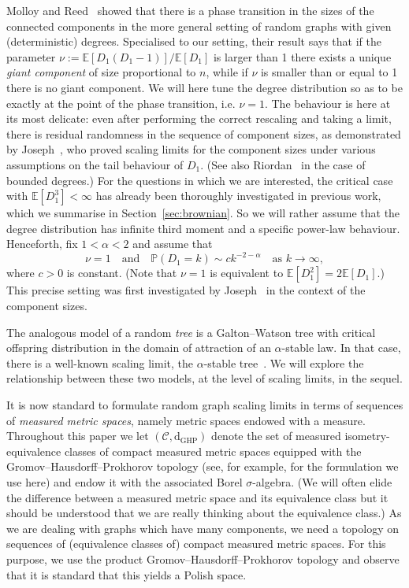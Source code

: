 \documentclass[10pt]{amsart}
\theoremstyle{definition}\newtheorem{defi}[theo]{Definition}\newtheorem{rema}[theo]{Remark}\newtheorem{exam}[theo]{Example}\newtheorem{exem}[theo]{Example}\newtheorem{nota}[theo]{Notation}
\newcommand{\E}[1]{\ensuremath{\mathbb{E} \left[#1 \right]}}
\newcommand{\Prob}[1]{\ensuremath{\mathbb{P} \left(#1 \right)}}
\newcommand{\GHP}{\mathrm{GHP}}
\newcommand{\rmd}{\mathrm{d}}
\newcommand{\scrC}{\mathscr{C}}
\newcommand{\bbE}{\mathbb{E}}
\begin{document}
Molloy and Reed~\cite{MolloyReed} showed that there is a phase transition in the sizes of the connected components in the more general setting of random graphs with given (deterministic) degrees. Specialised to our setting, their result says that if the parameter $\nu:=\bbE[D_1(D_1-1)]/\bbE[D_1]$ is larger than 1 there exists a unique \emph{giant component} of size proportional to $n$, while if $\nu$ is smaller than or equal to 1 there is no giant component. We will here tune the degree distribution so as to be exactly at the point of the phase transition, i.e. $\nu = 1$. The behaviour is here at its most delicate: even after performing the correct rescaling and taking a limit, there is residual randomness in the sequence of component sizes, as demonstrated by Joseph~\cite{Joseph14}, who proved scaling limits for the component sizes under various assumptions on the tail behaviour of $D_1$. (See also Riordan~\cite{Riordan12} in the case of bounded degrees.) For the questions in which we are interested, the critical case with $\E{D_1^3} < \infty$ has already been thoroughly investigated in previous work, which we summarise in Section~\ref{sec:brownian}. So we will rather assume that the degree distribution has infinite third moment and a specific power-law behaviour. Henceforth, fix $1 <\alpha <2$ and assume that
\begin{equation}\label{hyp:stable}
\nu = 1 \quad \text{and} \quad \Prob{D_1 = k} \sim c k^{-2-\alpha} \quad \text{as } k \to \infty,
\end{equation}
where $c > 0$ is constant. (Note that $\nu = 1$ is equivalent to $\E{D_1^2} = 2 \E{D_1}$.) This precise setting was first investigated by Joseph~\cite{Joseph14} in the context of the component sizes.

The analogous model of a random \emph{tree} is a Galton--Watson tree with critical offspring distribution in the domain of attraction of an $\alpha$-stable law. In that case, there is a well-known scaling limit, the $\alpha$-stable tree~\cite{Du03}. We will explore the relationship between these two models, at the level of scaling limits, in the sequel.

It is now standard to formulate random graph scaling limits in terms of sequences of \emph{measured metric spaces}, namely metric spaces endowed with a measure. Throughout this paper we let $(\scrC, \rmd_{\GHP})$ denote the set of measured isometry-equivalence classes of compact measured metric spaces equipped with the Gromov--Hausdorff--Prokhorov topology (see, for example, \cite[Section~2.1]{ABBrGoMi} for the formulation we use here) and endow it with the associated Borel $\sigma$-algebra. (We will often elide the difference between a measured metric space and its equivalence class but it should be understood that we are really thinking about the equivalence class.) As we are dealing with graphs which have many components, we need a topology on sequences of (equivalence classes of) compact measured metric spaces. For this purpose, we use the product Gromov--Hausdorff--Prokhorov topology and observe that it is standard that this yields a Polish space.
\end{document}

